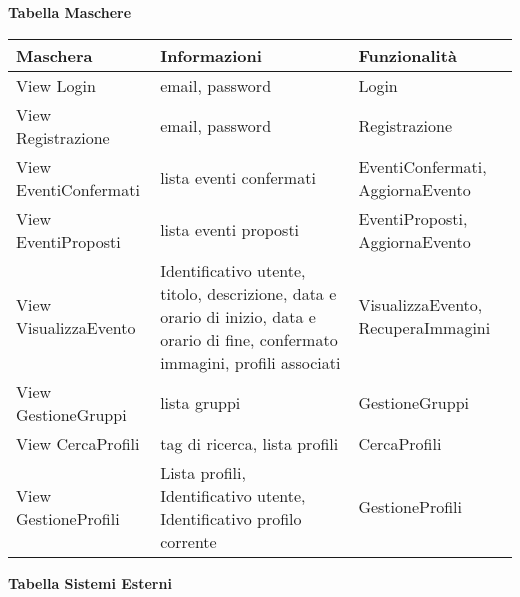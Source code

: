 \textbf{Tabella Maschere}
\hfill \break

\begin{tabular} {|P{4.5cm}|P{6.5cm}|P{4cm}|}
    \hline
    \textbf{Maschera}     & \textbf{Informazioni}                                                                                                              & \textbf{Funzionalità}              \\
    \hline
    View Login            & email, password                                                                                                                    & Login                              \\
    \hline
    View Registrazione    & email, password                                                                                                                    & Registrazione                      \\
    \hline
    View EventiConfermati & lista eventi confermati                                                                                                            & EventiConfermati, AggiornaEvento   \\
    \hline
    View EventiProposti   & lista eventi proposti                                                                                                              & EventiProposti, AggiornaEvento     \\
    \hline
    View VisualizzaEvento & Identificativo utente, titolo, descrizione, data e orario di inizio, data e orario di fine, confermato immagini, profili associati & VisualizzaEvento, RecuperaImmagini \\
    \hline
    View GestioneGruppi   & lista gruppi                                                                                                                       & GestioneGruppi                     \\
    \hline
    View CercaProfili     & tag di ricerca, lista profili                                                                                                      & CercaProfili                       \\
    \hline
    View GestioneProfili  & Lista profili, Identificativo utente, Identificativo profilo corrente                                                              & GestioneProfili                    \\
    \hline
\end{tabular}
\hfill \break

\textbf{Tabella Sistemi Esterni}
\hfill \break

